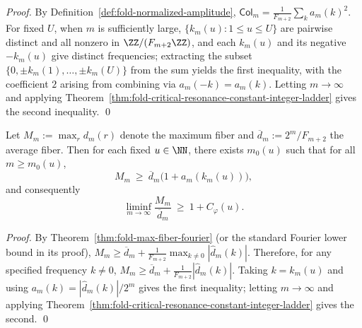\begin{proof}
By Definition~\ref{def:fold-normalized-amplitude},
\(
\mathsf{Col}_m=\frac{1}{F_{m+2}}\sum_{k}a_m(k)^2
\).
For fixed \(U\), when \(m\) is sufficiently large, \(\{k_m(u):1\le u\le U\}\) are pairwise distinct and all nonzero in \(\ZZ/(F_{m+2}\ZZ)\),
and each \(k_m(u)\) and its negative \(-k_m(u)\) give distinct frequencies; extracting the subset \(\{0,\pm k_m(1),\dots,\pm k_m(U)\}\) from the sum yields the first inequality,
with the coefficient \(2\) arising from combining via \(a_m(-k)=a_m(k)\).
Letting \(m\to\infty\) and applying Theorem~\ref{thm:fold-critical-resonance-constant-integer-ladder} gives the second inequality. \qed
\end{proof}

\begin{corollary}\label{cor:fold-maxfiber-bias-resonance-ladder}
Let \(M_m:=\max_r d_m(r)\) denote the maximum fiber and \(\overline d_m:=2^m/F_{m+2}\) the average fiber.
Then for each fixed \(u\in\NN\), there exists \(m_0(u)\) such that for all \(m\ge m_0(u)\),
\[
M_m\ \ge\ \overline d_m\bigl(1+a_m(k_m(u))\bigr),
\]
and consequently
\[
\liminf_{m\to\infty}\frac{M_m}{\overline d_m}\ \ge\ 1+C_\varphi(u).
\]
\end{corollary}

\begin{proof}
By Theorem~\ref{thm:fold-max-fiber-fourier} (or the standard Fourier lower bound in its proof),
\(
M_m\ge \overline d_m+\frac{1}{F_{m+2}}\max_{k\ne 0}|\widehat d_m(k)|
\).
Therefore, for any specified frequency \(k\ne 0\),
\(
M_m\ge \overline d_m+\frac{1}{F_{m+2}}|\widehat d_m(k)|
\).
Taking \(k=k_m(u)\) and using \(a_m(k)=|\widehat d_m(k)|/2^m\) gives the first inequality;
letting \(m\to\infty\) and applying Theorem~\ref{thm:fold-critical-resonance-constant-integer-ladder} gives the second. \qed
\end{proof}

